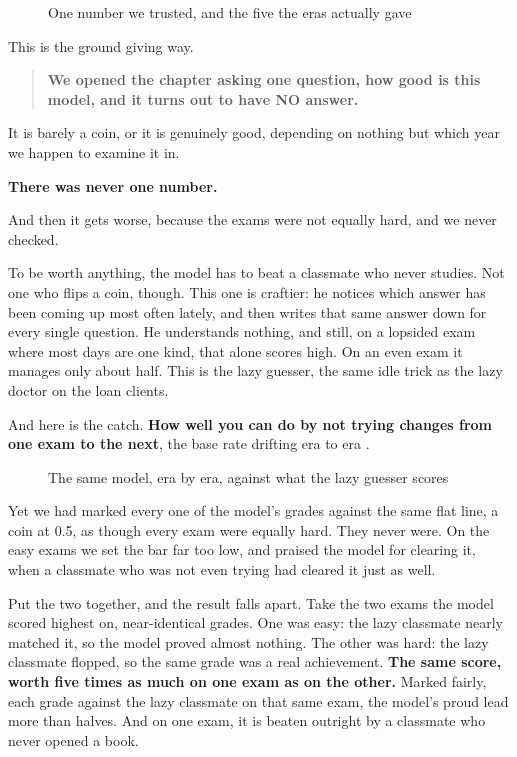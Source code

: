 \documentclass[11pt]{article} %
\begin{document}
\begin{figure}[htbp]
\centering

\caption{One number we trusted, and the five the eras actually gave}
\end{figure}


This is the ground giving way. 

\begin{quote}
\textbf{We opened the chapter asking one question, how good is this model, and it turns out to have NO answer.}
\end{quote}


It is barely a coin, or it is genuinely good, depending on nothing but which year we happen to examine it in.

\textbf{There was never one number.}

And then it gets worse, because the exams were not equally hard, and we never checked.

To be worth anything, the model has to beat a classmate who never studies. Not one who flips a coin, though. This one is craftier: he notices which answer has been coming up most often lately, and then writes that same answer down for every single question. He understands nothing, and still, on a lopsided exam where most days are one kind, that alone scores high. On an even exam it manages only about half. This is the lazy guesser, the same idle trick as the lazy doctor on the loan clients.

And here is the catch. \textbf{How well you can do by not trying changes from one exam to the next}, the base rate drifting era to era \cite{gama:2014}.

\begin{figure}[htbp]
\centering

\caption{The same model, era by era, against what the lazy guesser scores}
\end{figure}


Yet we had marked every one of the model's grades against the same flat line, a coin at 0.5, as though every exam were equally hard. They never were. On the easy exams we set the bar far too low, and praised the model for clearing it, when a classmate who was not even trying had cleared it just as well.

Put the two together, and the result falls apart. Take the two exams the model scored highest on, near-identical grades. One was easy: the lazy classmate nearly matched it, so the model proved almost nothing. The other was hard: the lazy classmate flopped, so the same grade was a real achievement. \textbf{The same score, worth five times as much on one exam as on the other.} Marked fairly, each grade against the lazy classmate on that same exam, the model's proud lead more than halves. And on one exam, it is beaten outright by a classmate who never opened a book.
\end{document}

